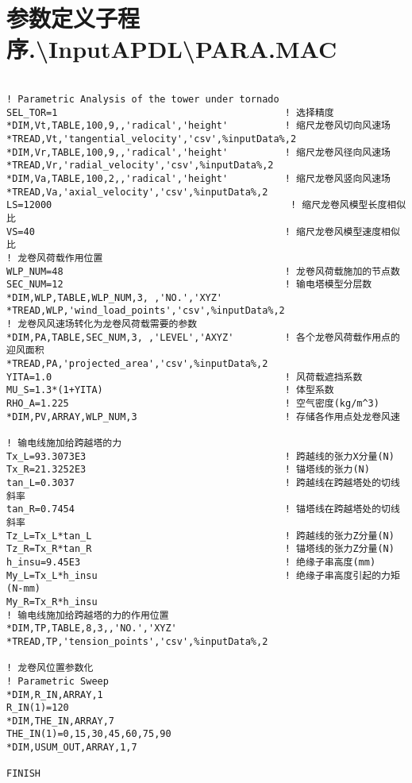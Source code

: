 \section{参数定义子程序.\textbackslash{}InputAPDL\textbackslash{}PARA.MAC}
\begin{verbatim}

! Parametric Analysis of the tower under tornado
SEL_TOR=1                                        ! 选择精度
*DIM,Vt,TABLE,100,9,,'radical','height'          ! 缩尺龙卷风切向风速场
*TREAD,Vt,'tangential_velocity','csv',%inputData%,2
*DIM,Vr,TABLE,100,9,,'radical','height'          ! 缩尺龙卷风径向风速场
*TREAD,Vr,'radial_velocity','csv',%inputData%,2
*DIM,Va,TABLE,100,2,,'radical','height'          ! 缩尺龙卷风竖向风速场
*TREAD,Va,'axial_velocity','csv',%inputData%,2
LS=12000                                          ! 缩尺龙卷风模型长度相似比
VS=40                                            ! 缩尺龙卷风模型速度相似比
! 龙卷风荷载作用位置
WLP_NUM=48                                       ! 龙卷风荷载施加的节点数
SEC_NUM=12                                       ! 输电塔模型分层数
*DIM,WLP,TABLE,WLP_NUM,3, ,'NO.','XYZ'
*TREAD,WLP,'wind_load_points','csv',%inputData%,2
! 龙卷风风速场转化为龙卷风荷载需要的参数
*DIM,PA,TABLE,SEC_NUM,3, ,'LEVEL','AXYZ'         ! 各个龙卷风荷载作用点的迎风面积
*TREAD,PA,'projected_area','csv',%inputData%,2
YITA=1.0                                         ! 风荷载遮挡系数
MU_S=1.3*(1+YITA)                                ! 体型系数
RHO_A=1.225                                      ! 空气密度(kg/m^3)
*DIM,PV,ARRAY,WLP_NUM,3                          ! 存储各作用点处龙卷风速

! 输电线施加给跨越塔的力
Tx_L=93.3073E3                                   ! 跨越线的张力X分量(N)
Tx_R=21.3252E3                                   ! 锚塔线的张力(N)
tan_L=0.3037                                     ! 跨越线在跨越塔处的切线斜率
tan_R=0.7454                                     ! 锚塔线在跨越塔处的切线斜率
Tz_L=Tx_L*tan_L                                  ! 跨越线的张力Z分量(N)
Tz_R=Tx_R*tan_R                                  ! 锚塔线的张力Z分量(N)
h_insu=9.45E3                                    ! 绝缘子串高度(mm)
My_L=Tx_L*h_insu                                 ! 绝缘子串高度引起的力矩(N-mm)
My_R=Tx_R*h_insu
! 输电线施加给跨越塔的力的作用位置
*DIM,TP,TABLE,8,3,,'NO.','XYZ'
*TREAD,TP,'tension_points','csv',%inputData%,2

! 龙卷风位置参数化
! Parametric Sweep
*DIM,R_IN,ARRAY,1
R_IN(1)=120
*DIM,THE_IN,ARRAY,7
THE_IN(1)=0,15,30,45,60,75,90
*DIM,USUM_OUT,ARRAY,1,7

FINISH
\end{verbatim}

